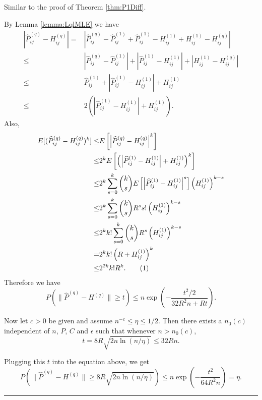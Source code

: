 \documentclass[a4paper]{article}
\newenvironment{proof}{{\bf Proof:  }}{\hfill\rule{2mm}{2mm}}
\renewcommand{\hat}{\widehat}
\begin{document}
\begin{proof}
Similar to the proof of Theorem \ref{thm:P1Diff}.

By Lemma \ref{lemma:LqlMLE} we have
\begin{align*}
	\left| \hat{P}^{(q)}_{ij} - H^{(q)}_{ij} \right|
    = & \left| \hat{P}^{(q)}_{ij} - \hat{P}^{(1)}_{ij} + \hat{P}^{(1)}_{ij} - H^{(1)}_{ij} + H^{(1)}_{ij} - H^{(q)}_{ij} \right| \\
    \le & \left| \hat{P}^{(q)}_{ij} - \hat{P}^{(1)}_{ij} \right| + \left| \hat{P}^{(1)}_{ij} - H^{(1)}_{ij} \right| + \left| H^{(1)}_{ij} - H^{(q)}_{ij} \right| \\
    \le & \hat{P}^{(1)}_{ij} + \left| \hat{P}^{(1)}_{ij} - H^{(1)}_{ij} \right| +  H^{(1)}_{ij} \\
    \le & 2 \left( \left| \hat{P}^{(1)}_{ij} - H^{(1)}_{ij} \right| + H^{(1)}_{ij} \right).
\end{align*}
Also,
\begin{align*}
	E[(\hat{P}^{(q)}_{ij} - H^{(q)}_{ij})^k]
    \le & E\left[\left|\hat{P}^{(q)}_{ij} - H^{(q)}_{ij}\right|^k\right] \\
    \le & 2^k E \left[ \left( \left| \hat{P}^{(1)}_{ij} - H^{(1)}_{ij} \right| + H^{(1)}_{ij} \right)^k \right] \\
    \le & 2^k \sum_{s = 0}^k \binom{k}{s} E \left[ \left| \hat{P}^{(1)}_{ij} - H^{(1)}_{ij} \right|^s \right] \left( H^{(1)}_{ij} \right)^{k-s} \\
    \le & 2^k \sum_{s = 0}^k \binom{k}{s} R^s s! \left( H^{(1)}_{ij} \right)^{k-s} \\
    \le & 2^k k! \sum_{s = 0}^k \binom{k}{s} R^s \left( H^{(1)}_{ij} \right)^{k-s} \\
    = & 2^k k! \left( R + H^{(1)}_{ij} \right)^k \\
    \le & 2^{2k} k! R^k.
    \stepcounter{equation}\tag{\theequation}\label{eqn:expectpdiffqpowerk}
\end{align*}
Therefore we have
\[
	P \left( \| \hat{P}^{(q)} - H^{(q)} \| \ge t \right)
    \le n \exp \left( - \frac{t^2/2}{32 R^2 n + R t} \right).
\]

Now let $c > 0$ be given and assume $n^{-c} \le \eta \le 1/2$. Then there exists a $n_0(c)$ independent of $n$, $P$, $C$ and $\epsilon$ such that whenever $n > n_0(c)$,
\[
	t = 8 R \sqrt{2 n \ln(n/\eta)} \le 32 R n.
\]

Plugging this $t$ into the equation above, we get
\[
	P(\| \hat{P}^{(q)} - H^{(q)} \| \ge 8 R \sqrt{2 n \ln(n/\eta)})
    \le n \exp\left(-\frac{t^2}{64 R^2 n}\right) = \eta.
\]
\end{proof}
\end{document}
